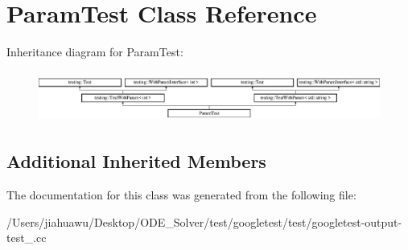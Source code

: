 \hypertarget{class_param_test}{}\section{Param\+Test Class Reference}
\label{class_param_test}
Inheritance diagram for Param\+Test\+:\begin{figure}[H]
\begin{center}
\leavevmode
\includegraphics[height=1.686747cm]{class_param_test}
\end{center}
\end{figure}
\subsection*{Additional Inherited Members}


The documentation for this class was generated from the following file\+:\begin{DoxyCompactItemize}
\item 
/\+Users/jiahuawu/\+Desktop/\+O\+D\+E\+\_\+\+Solver/test/googletest/test/googletest-\/output-\/test\+\_\+.\+cc\end{DoxyCompactItemize}
